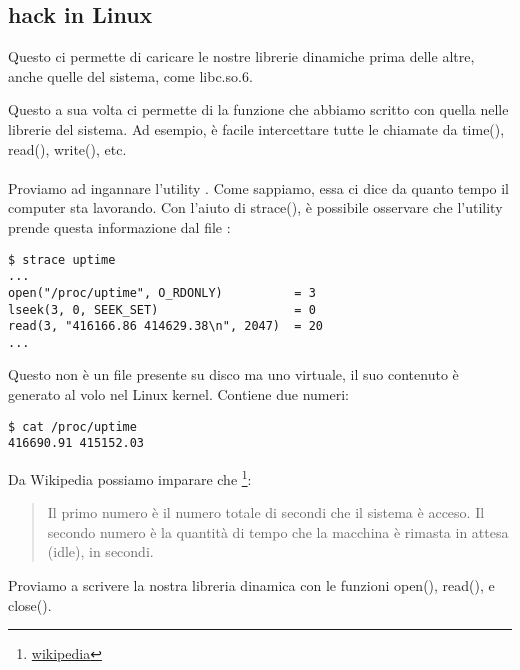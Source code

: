 \subsection{ hack in Linux}

\label{ld_preload}

Questo ci permette di caricare le nostre librerie dinamiche prima delle altre, anche quelle del sistema, come libc.so.6.

Questo a sua volta ci permette di  la funzione che abbiamo scritto con quella nelle librerie del sistema.
Ad esempio, è facile intercettare tutte le chiamate da  
time(), read(), write(), etc. \\
\\
Proviamo ad ingannare l'utility .
Come sappiamo, essa ci dice da quanto tempo il computer sta lavorando.
Con l'aiuto di strace(), è possibile osservare che l'utility prende questa informazione dal file :

\begin{lstlisting}
$ strace uptime 
...
open("/proc/uptime", O_RDONLY)          = 3
lseek(3, 0, SEEK_SET)                   = 0
read(3, "416166.86 414629.38\n", 2047)  = 20
...
\end{lstlisting}

Questo non è un file presente su disco ma uno virtuale, il suo contenuto è generato al volo nel Linux kernel.
Contiene due numeri:

\begin{lstlisting}
$ cat /proc/uptime
416690.91 415152.03
\end{lstlisting}

Da Wikipedia possiamo imparare che
\footnote{\href{http://go.yurichev.com/17043}{wikipedia}}:

\begin{framed}
\begin{quotation}
Il primo numero è il numero totale di secondi che il sistema è acceso.
Il secondo numero è la quantità di tempo che la macchina è rimasta in attesa (idle), in secondi.
\end{quotation}
\end{framed}


Proviamo a scrivere la nostra libreria dinamica con le funzioni open(), read(), e close().

